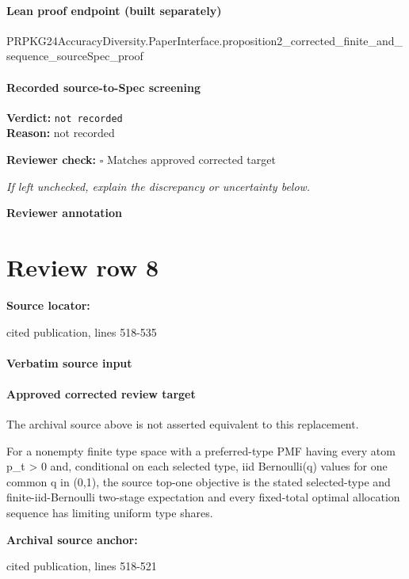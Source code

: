 \documentclass[10pt]{article}
\newcommand{\reviewerbox}{%
  \par\noindent\fbox{\parbox{0.96\linewidth}{\rule{0pt}{0.38in}}}\par
}
\newcommand{\reviewmatch}[1]{%
  \par\noindent\textbf{Reviewer check:} $\square$\; #1\par
  \noindent\emph{If left unchecked, explain the discrepancy or uncertainty below.}\par
}
\begin{document}
\paragraph{Lean proof endpoint (built separately)}\begin{ReviewVerbatim}
PRPKG24AccuracyDiversity.PaperInterface.proposition2_corrected_finite_and_sequence_sourceSpec_proof
\end{ReviewVerbatim}

\paragraph{Recorded source-to-Spec screening}
\textbf{Verdict:} \texttt{not recorded}
\\
\textbf{Reason:} not recorded
\reviewmatch{Matches approved corrected target}
\noindent\textbf{Reviewer annotation}\par
\reviewerbox
\clearpage
\hypertarget{source-claim-f61ea0b8a68fcc23}{}
\section*{Review row 8}
\textbf{Source locator:} {\footnotesize\raggedright cited publication, lines 518-\allowbreak{}535\par}
\paragraph{Verbatim source input}
\begin{ReviewVerbatim}
\end{ReviewVerbatim}

\paragraph{Approved corrected review target}
The archival source above is not asserted equivalent to this replacement.
\begin{ReviewVerbatim}
For a nonempty finite type space with a preferred-type PMF having every atom p_t > 0 and, conditional on each selected type, iid Bernoulli(q) values for one common q in (0,1), the source top-one objective is the stated selected-type and finite-iid-Bernoulli two-stage expectation and every fixed-total optimal allocation sequence has limiting uniform type shares.
\end{ReviewVerbatim}

\textbf{Archival source anchor:} {\footnotesize\raggedright cited publication, lines 518-\allowbreak{}521\par}
\end{document}
